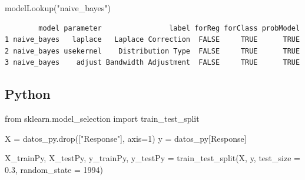 \documentclass[
  letterpaper,
  DIV=11,
  numbers=noendperiod]{scrartcl}
\newenvironment{Shaded}{\begin{snugshade}}{\end{snugshade}}
\newcommand{\AttributeTok}[1]{\textcolor[rgb]{0.40,0.45,0.13}{#1}}
\newcommand{\ConstantTok}[1]{\textcolor[rgb]{0.56,0.35,0.01}{#1}}
\newcommand{\DecValTok}[1]{\textcolor[rgb]{0.68,0.00,0.00}{#1}}
\newcommand{\FloatTok}[1]{\textcolor[rgb]{0.68,0.00,0.00}{#1}}
\newcommand{\FunctionTok}[1]{\textcolor[rgb]{0.28,0.35,0.67}{#1}}
\newcommand{\ImportTok}[1]{\textcolor[rgb]{0.00,0.46,0.62}{#1}}
\newcommand{\NormalTok}[1]{\textcolor[rgb]{0.00,0.23,0.31}{#1}}
\newcommand{\OperatorTok}[1]{\textcolor[rgb]{0.37,0.37,0.37}{#1}}
\newcommand{\OtherTok}[1]{\textcolor[rgb]{0.00,0.23,0.31}{#1}}
\newcommand{\SpecialCharTok}[1]{\textcolor[rgb]{0.37,0.37,0.37}{#1}}
\newcommand{\StringTok}[1]{\textcolor[rgb]{0.13,0.47,0.30}{#1}}
\begin{document}
\begin{Shaded}
\end{Shaded}

\begin{Shaded}
\begin{Highlighting}[]
\FunctionTok{modelLookup}\NormalTok{(}\StringTok{"naive\_bayes"}\NormalTok{)}
\end{Highlighting}
\end{Shaded}

\begin{verbatim}
        model parameter                label forReg forClass probModel
1 naive_bayes   laplace   Laplace Correction  FALSE     TRUE      TRUE
2 naive_bayes usekernel    Distribution Type  FALSE     TRUE      TRUE
3 naive_bayes    adjust Bandwidth Adjustment  FALSE     TRUE      TRUE
\end{verbatim}

\subsection{Python}

\begin{Shaded}
\begin{Highlighting}[]
\ImportTok{from}\NormalTok{ sklearn.model\_selection }\ImportTok{import}\NormalTok{ train\_test\_split}

\NormalTok{X }\OperatorTok{=}\NormalTok{ datos\_py.drop([}\StringTok{"Response"}\NormalTok{], axis}\OperatorTok{=}\DecValTok{1}\NormalTok{)}
\NormalTok{y }\OperatorTok{=}\NormalTok{ datos\_py[}\StringTok{\textquotesingle{}Response\textquotesingle{}}\NormalTok{]}

\NormalTok{X\_trainPy, X\_testPy, y\_trainPy, y\_testPy }\OperatorTok{=}\NormalTok{ train\_test\_split(X, y, test\_size }\OperatorTok{=} \FloatTok{0.3}\NormalTok{, random\_state }\OperatorTok{=} \DecValTok{1994}\NormalTok{)}
\end{Highlighting}
\end{Shaded}
\end{document}
